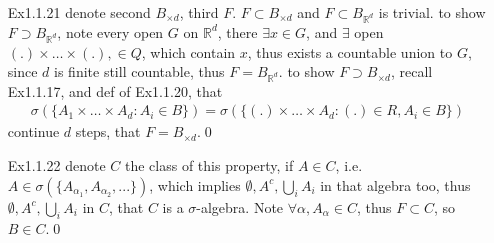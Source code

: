 \documentclass[paper=a4, fontsize=11pt]{scrartcl} %
\numberwithin{equation}{section} %
\numberwithin{figure}{section} %
\numberwithin{table}{section} %
\begin{document}
\begin{itemize}
\begin{itemize}
\begin{align}
				&= (A^c \cup H^c) \cap  H \\
				&= (A\cap H)^c \cap H
		\end{align}
		by closed under intersection, i.e. $A^c\cap H\in \mathcal{H}$, that $A^c\in \mathcal{H}^H$; similarily
		\begin{align}
			(\bigcup_i A_i)\cap H &= ((\bigcup_i A_i)\cup H^c) \cap H\\
				&= (\bigcup_i(A_i\cup H^c)) \cap H\\
				&= \bigcup_i ((A_i\cap H)^c \cap H)
		\end{align}
		by closed under union, that $\bigcup_i A_i \in \mathcal{H}^H$.\qed
		\item[(c)] let $H_1\subseteq H_2$, then
		\begin{align}
			A\cap H_1 &= A\cap (H_1 \cap H_2)\\
				&= (A\cap H_2) \cap H_1
		\end{align}
		i.e. $A\in \mathcal{H}^{H_2}$ will imply $A\in \mathcal{H}^{H_1}$, so non-increasing. Thus $\mathcal{H}^{H\cup H'} \subseteq \mathcal{H}^H \cap \mathcal{H}^{H'}$, and if $A\in \mathcal{H}^H \cap \mathcal{H}^{H'}$, that
		\begin{align}
			A \cap (H\cup H') = (A\cap H) \cup (A\cap H')
		\end{align}
		implies $A\in \mathcal{H}^{H\cup H'}$, proved equality.\qed
	\end{itemize}
	\item[Ex1.1.21] denote second $B_{\times d}$, third $F$. $F\subset B_{\times d}$ and $F\subset B_{\mathbb{R}^d}$ is trivial. to show $F\supset B_{\mathbb{R}^d}$, note every open $G$ on $\mathbb{R}^d$, there $\exists x\in G$, and $\exists$ open $(.)\times\dots \times(.), \in Q$, which contain $x$, thus exists a countable union to $G$, since $d$ is finite still countable, thus $F= B_{\mathbb{R}^d}$. to show $F\supset B_{\times d}$, recall Ex1.1.17, and def of Ex1.1.20, that
	\begin{align}
		\sigma(\{A_1\times\dots \times A_d: A_i\in B\}) = \sigma(\{ (.)\times\dots \times A_d: (.)\in R, A_i\in B\})
	\end{align}
	continue $d$ steps, that $F= B_{\times d}$.\qed
	\item[Ex1.1.22] denote $C$ the class of this property, if $A\in C$, i.e. $A\in \sigma(\{A_{\alpha_1},A_{\alpha_2},...\})$, which implies $\emptyset, A^c, \bigcup_i A_i$ in that algebra too, thus $\emptyset, A^c, \bigcup_i A_i$ in $C$, that $C$ is a $\sigma$-algebra. Note $\forall \alpha, A_\alpha\in C$, thus $F\subset C$, so $B\in C$.\qed

\end{itemize}
\end{document}

